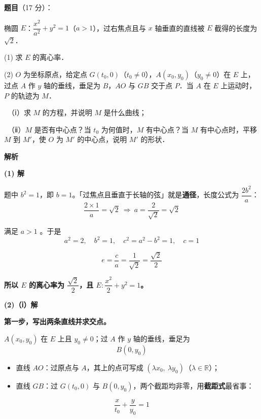 \begin{answer}

\textbf{题目}（17 分）：

椭圆 $E$：$\dfrac{x^2}{a^2}+y^2=1$（$a>1$），过右焦点且与 $x$ 轴垂直的直线被 $E$ 截得的长度为 $\sqrt{2}$．

  (1) 求 $E$ 的离心率．

  (2) $O$ 为坐标原点，给定点 $G(t_0,0)$（$t_0\ne0$），$A(x_0,y_0)$（$y_0\ne0$）在 $E$ 上，过点 $A$ 作 $y$ 轴的垂线，垂足为 $B$，$AO$ 与 $GB$ 交于点 $P$．当 $A$ 在 $E$ 上运动时，$P$ 的轨迹为 $M$．

  　（ⅰ）求 $M$ 的方程，并说明 $M$ 是什么曲线；

  　（ⅱ）$M$ 是否有中心点？当 $t_0$ 为何值时，$M$ 有中心点？当 $M$ 有中心点时，平移 $M$ 到 $M'$，使 $O$ 为 $M'$ 的中心点，说明 $M'$ 的形状．

\textbf{解析}

\par\medskip

\textbf{(1) 解}

题中 $b^2=1$，即 $b=1$。「过焦点且垂直于长轴的弦」就是\textbf{通径}，长度公式为 $\dfrac{2b^2}{a}$：
\nopagebreak[4]
\[\frac{2\times1}{a}=\sqrt2\ \Longrightarrow\ a=\frac{2}{\sqrt2}=\sqrt2\]

满足 $a>1$ 。于是
\nopagebreak[4]
\[a^2=2,\quad b^2=1,\quad c^2=a^2-b^2=1,\quad c=1\]

\nopagebreak[4]
\[e=\frac{c}{a}=\frac{1}{\sqrt2}=\frac{\sqrt2}{2}\]

\textbf{所以 $E$ 的离心率为 $\dfrac{\sqrt2}{2}$，且 $E:\dfrac{x^2}{2}+y^2=1$。}

\par\medskip

\textbf{(2)（ⅰ）解}

\textbf{第一步，写出两条直线并求交点。}

$A(x_0,y_0)$ 在 $E$ 上且 $y_0\ne0$；过 $A$ 作 $y$ 轴的垂线，垂足为
\nopagebreak[4]
\[B(0,y_0)\]

\begin{itemize}
\item 直线 $AO$：过原点与 $A$，其上的点可写成 $\left(\lambda x_0,\ \lambda y_0\right)$（$\lambda\in\mathbb{R}$）；
\item 直线 $GB$：过 $G(t_0,0)$ 与 $B(0,y_0)$，两个截距均非零，用\textbf{截距式}最省事：
\end{itemize}
\nopagebreak[4]
\[\frac{x}{t_0}+\frac{y}{y_0}=1\]


\end{answer}
